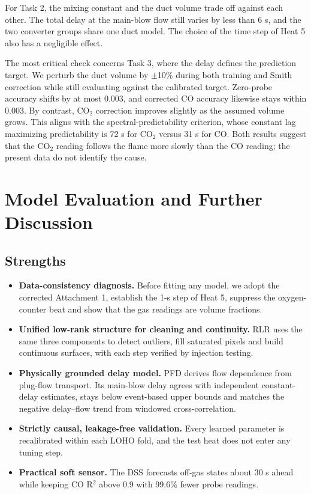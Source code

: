 For Task 2, the mixing constant and the duct volume trade off against each other. The total delay at the main-blow flow still varies by less than 6 s, and the two converter groups share one duct model. The choice of the time step of Heat 5 also has a negligible effect.

The most critical check concerns Task 3, where the delay defines the prediction target. We perturb the duct volume by \ensuremath{\pm}10\% during both training and Smith correction while still evaluating against the calibrated target. Zero-probe accuracy shifts by at most 0.003, and corrected CO accuracy likewise stays within 0.003. By contrast, CO\ensuremath{_{2}} correction improves slightly as the assumed volume grows. This aligns with the spectral-predictability criterion, whose constant lag maximizing predictability is 72 s for CO\ensuremath{_{2}} versus 31 s for CO. Both results suggest that the CO\ensuremath{_{2}} reading follows the flame more slowly than the CO reading; the present data do not identify the cause.



\FloatBarrier
\section[Model Evaluation and Discussion]{Model Evaluation and Further Discussion}\label{sec:9}

\subsection{Strengths}\label{sec:9.1}

\begin{itemize}
\item \textbf{Data-consistency diagnosis.} Before fitting any model, we adopt the corrected Attachment 1, establish the 1-s step of Heat 5, suppress the oxygen-counter beat and show that the gas readings are volume fractions.
\item \textbf{Unified low-rank structure for cleaning and continuity.} RLR uses the same three components to detect outliers, fill saturated pixels and build continuous surfaces, with each step verified by injection testing.
\item \textbf{Physically grounded delay model.} PFD derives flow dependence from plug-flow transport. Its main-blow delay agrees with independent constant-delay estimates, stays below event-based upper bounds and matches the negative delay–flow trend from windowed cross-correlation.
\item \textbf{Strictly causal, leakage-free validation.} Every learned parameter is recalibrated within each LOHO fold, and the test heat does not enter any tuning step.
\item \textbf{Practical soft sensor.} The DSS forecasts off-gas states about 30 s ahead while keeping CO R\ensuremath{^{2}} above 0.9 with 99.6\% fewer probe readings.
\end{itemize}

